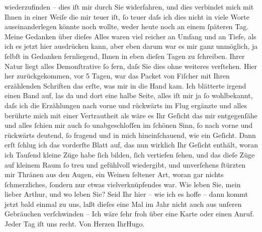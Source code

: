 \begin{ledgroupsized}[t]{13cm}
               wiederzufinden – dies iſt mir durch Sie widerfahren, und dies verbindet mich mit
               Ihnen in einer Weiſe die mir teuer iſt, ſo teuer daſs ich dies nicht in viele Worte
               auseinanderlegen könnte noch wollte, weder heute noch an einem ſpäteren Tag.\pend
           \pstart
           Meine Gedanken über dieſes Alles waren viel reicher an Umfang und an Tiefe, als ich
               es jetzt hier ausdrücken kann, aber eben darum war es mir ganz {\pb}unmöglich, ja ſelbſt in Gedanken fernliegend, Ihnen in
               eben dieſen Tagen zu ſchreiben. Ihrer Natur liegt alles Demonſtrative ſo fern, daſs
               Sie dies ohne weiteres verſtehen.\pend
           \pstart
           Hier her zurückgekommen, vor 5 Tagen, war das Packet von Fiſcher mit Ihren erzählenden
                  Schriften das erſte, was mir in die Hand kam. Ich blätterte irgend einen Band
               auf, las da und dort eine halbe Seite, alles iſt mir ja ſo wohlbekannt, daſs ich die
               Erzählungen nach vorne und rückwärts im Flug ergänzte und alles berührte mich mit
               einer Vertrautheit als wäre es Ihr Geſicht das mir entgegenſähe und alles ſchien mir
               auch ſo unabgeschloſſen im ſchönen Sinn, ſo nach vorne und rückwärts deutend, ſo
               fragend und in mich hineinſchauend, wie ein Geſicht. Dann erſt ſchlug ich das
               vorderſte Blatt auf, das nun wirklich Ihr Geſicht enthält, woran ich Tauſend kleine Züge habe ſich
               bilden, ſich vertiefen ſehen, und das dieſe Züge auf kleinem Raum ſo treu und
               gefühlvoll wiedergibt, und unverſehens ſtürzten mir {\pb}Thränen aus den Augen, ein Weinen ſeltener Art, woran gar nichts ſchmerzliches,
               ſondern nur etwas vielverknüpfendes war.\pend
           \pstart
           Wie leben Sie, mein lieber Arthur, und wo leben Sie? Seid Ihr hier – wie ich es hoffe
               – dann kommt jetzt bald einmal zu uns, laßt dieſes eine Mal im Jahr nicht auch aus
               unſeren Gebräuchen verſchwinden – \pend
           \pstart
           Ich wäre ſehr froh über eine Karte oder einen Anruf. Jeder Tag iſt uns recht.\pend
           \pstart Von Herzen Ihr\spacefill\mbox{Hugo.}\pend{}
         
         \endnumbering{}\end{ledgroupsized}  \newcommand{\dateiname}{L02074}\newcommand{\titel}{Hugo von Hofmannsthal an Arthur Schnitzler, 12. 6. 1912}\newcommand{\editorInnen}{Martin Anton Müller und Gerd-Hermann Susen}
      